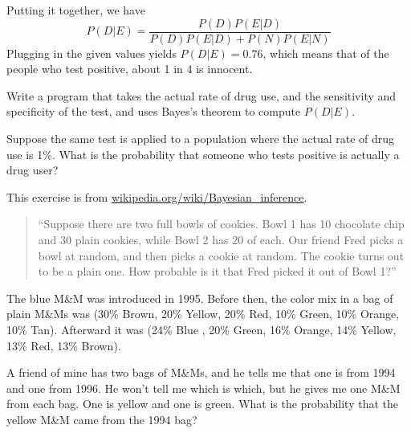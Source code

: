\documentclass[12pt]{book}
\begin{document}

Putting it together, we have
%
\[ P(D|E) = \frac{P(D) P(E|D)}{P(D) P(E|D) + P(N) P(E|N)}\]
%
Plugging in the given values yields $P(D|E) = 0.76$, which means
that of the people who test positive, about 1 in 4 is innocent. 

\begin{ex}

Write a program that takes the actual rate of drug use, and the
sensitivity and specificity of the test, and uses Bayes's theorem
to compute $P(D|E)$.

Suppose the same test is applied to a population where the actual
rate of drug use is 1\%.  What is the probability that someone
who tests positive is actually a drug user?

\end{ex}


\begin{ex}


This exercise is from \url{wikipedia.org/wiki/Bayesian_inference}.

\begin{quote}

``Suppose there are two full bowls of cookies. Bowl 1 has 10 chocolate
  chip and 30 plain cookies, while Bowl 2 has 20 of each. Our friend
  Fred picks a bowl at random, and then picks a cookie at random. The
  cookie turns out to be a plain one. How probable is it that Fred
  picked it out of Bowl 1?''

\end{quote}

\end{ex}

\begin{ex}


The blue M\&M was introduced in 1995.  Before then, the color mix in
a bag of plain M\&Ms was (30\% Brown, 20\% Yellow, 20\% Red, 10\%
Green, 10\% Orange, 10\% Tan).  Afterward it was (24\% Blue , 20\%
Green, 16\% Orange, 14\% Yellow, 13\% Red, 13\% Brown).

A friend of mine has two bags of M\&Ms, and he tells me
that one is from 1994 and one from 1996.  He won't tell me which is
which, but he gives me one M\&M from each bag.  One is yellow and
one is green.  What is the probability that the yellow M\&M came
from the 1994 bag?
  
\end{ex}
\end{document}
